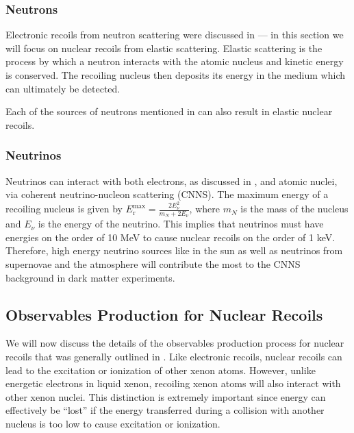\subsubsection{Neutrons}

Electronic recoils from neutron scattering were discussed in  --- in this section we will focus on nuclear recoils from elastic scattering.  Elastic scattering is the process by which a neutron interacts with the atomic nucleus and kinetic energy is conserved.  The recoiling nucleus then deposits its energy in the medium which can ultimately be detected.

Each of the sources of neutrons mentioned in  can also result in elastic nuclear recoils.




\subsubsection{Neutrinos}

Neutrinos can interact with both electrons, as discussed in , and atomic nuclei, via coherent neutrino-nucleon scattering (CNNS).  The maximum energy of a recoiling nucleus is given by $E_{\textrm{r}}^{\textrm{max}} = \frac{2 E_{\nu}^2}{m_N + 2 E_{\nu}}$, where $m_N$ is the mass of the nucleus and $E_{\nu}$ is the energy of the neutrino.  This implies that neutrinos must have energies on the order of 10 MeV to cause nuclear recoils on the order of 1 keV.  Therefore, high energy neutrino sources like  in the sun as well as neutrinos from supernovae and the atmosphere will contribute the most to the CNNS background in dark matter experiments.


\subsection{Observables Production for Nuclear Recoils}
\label{sec:xe_nr_observables}

We will now discuss the details of the observables production process for nuclear recoils that was generally outlined in .  Like electronic recoils, nuclear recoils can lead to the excitation or ionization of other xenon atoms.  However, unlike energetic electrons in liquid xenon, recoiling xenon atoms will also interact with other xenon nuclei.  This distinction is extremely important since energy can effectively be ``lost'' if the energy transferred during a collision with another nucleus is too low to cause excitation or ionization.  

